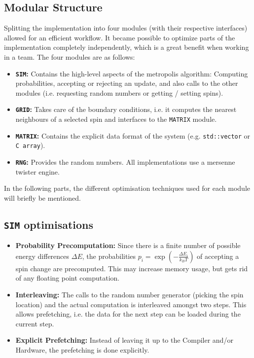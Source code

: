 \documentclass[letterpaper]{article}
\begin{document}
\subsection{Modular Structure} Splitting the implementation into four modules (with their respective interfaces) allowed for an efficient workflow. It became possible to optimize parts of the implementation completely independently, which is a great benefit when working in a team. The four modules are as follows:
\begin{itemize}[noitemsep, topsep = 0pt]
\item \textbf{\texttt{SIM}:} Contains the high-level aspects of the metropolis algorithm: Computing probabilities, accepting or rejecting an update, and also calls to the other modules (i.e. requesting random numbers or getting / setting spins).
\item \textbf{\texttt{GRID}:} Takes care of the boundary conditions, i.e. it computes the nearest neighbours of a selected spin and interfaces to the \texttt{MATRIX} module.
\item \textbf{\texttt{MATRIX}:} Contains the explicit data format  of the system (e.g. \texttt{std::vector} or \texttt{C array}).
\item \textbf{\texttt{RNG}:} Provides the random numbers. All implementations use a mersenne twister engine.
\end{itemize}
In the following parts, the different optimisation techniques used for each module will briefly be mentioned.
\subsection{\texttt{SIM} optimisations}\label{opt:sim}
\begin{itemize}[noitemsep, topsep = 0pt]
\item \textbf{Probability Precomputation:} Since there is a finite number of possible energy differences $\Delta E$, the probabilities $p_i = \exp{\left(-\frac{\Delta E_i}{k_B T}\right)}$ of accepting a spin change are precomputed. This may increase memory usage, but gets rid of any floating point computation.
\item \textbf{Interleaving:} The calls to the random number generator (picking the spin location) and the actual computation is interleaved amongst two steps. This allows prefetching, i.e. the data for the next step can be loaded during the current step.
\item \textbf{Explicit Prefetching:} Instead of leaving it up to the Compiler and/or Hardware, the prefetching is done explicitly. 
\end{itemize}
\end{document}
